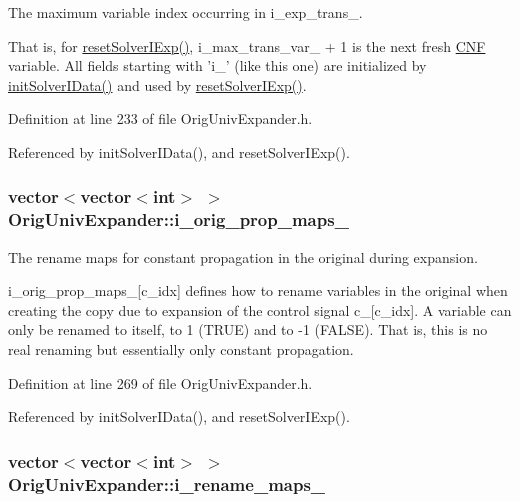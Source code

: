 The maximum variable index occurring in i\-\_\-exp\-\_\-trans\-\_\-. 

That is, for \hyperlink{classOrigUnivExpander_abcd12e41626b01f53ac7b8c654fa9218}{reset\-Solver\-I\-Exp()}, i\-\_\-max\-\_\-trans\-\_\-var\-\_\- + 1 is the next fresh \hyperlink{classCNF}{C\-N\-F} variable. All fields starting with 'i\-\_\-' (like this one) are initialized by \hyperlink{classOrigUnivExpander_a1ca430c08a9927733951149db492916e}{init\-Solver\-I\-Data()} and used by \hyperlink{classOrigUnivExpander_abcd12e41626b01f53ac7b8c654fa9218}{reset\-Solver\-I\-Exp()}. 

Definition at line 233 of file Orig\-Univ\-Expander.\-h.



Referenced by init\-Solver\-I\-Data(), and reset\-Solver\-I\-Exp().

\hypertarget{classOrigUnivExpander_a49a13d81ac5119a0a31aa0bbb8964e25}{
\subsubsection[{i\-\_\-orig\-\_\-prop\-\_\-maps\-\_\-}]{\setlength{\rightskip}{0pt plus 5cm}vector$<$vector$<$int$>$ $>$ Orig\-Univ\-Expander\-::i\-\_\-orig\-\_\-prop\-\_\-maps\-\_\-\hspace{0.3cm}{\ttfamily [protected]}}}\label{classOrigUnivExpander_a49a13d81ac5119a0a31aa0bbb8964e25}


The rename maps for constant propagation in the original during expansion. 

i\-\_\-orig\-\_\-prop\-\_\-maps\-\_\-\mbox{[}c\-\_\-idx\mbox{]} defines how to rename variables in the original when creating the copy due to expansion of the control signal c\-\_\-\mbox{[}c\-\_\-idx\mbox{]}. A variable can only be renamed to itself, to 1 (T\-R\-U\-E) and to -\/1 (F\-A\-L\-S\-E). That is, this is no real renaming but essentially only constant propagation. 

Definition at line 269 of file Orig\-Univ\-Expander.\-h.



Referenced by init\-Solver\-I\-Data(), and reset\-Solver\-I\-Exp().

\hypertarget{classOrigUnivExpander_ab9e2c9ca2129fed67662f36834198b08}{
\subsubsection[{i\-\_\-rename\-\_\-maps\-\_\-}]{\setlength{\rightskip}{0pt plus 5cm}vector$<$vector$<$int$>$ $>$ Orig\-Univ\-Expander\-::i\-\_\-rename\-\_\-maps\-\_\-\hspace{0.3cm}{\ttfamily [protected]}}}\label{classOrigUnivExpander_ab9e2c9ca2129fed67662f36834198b08}


